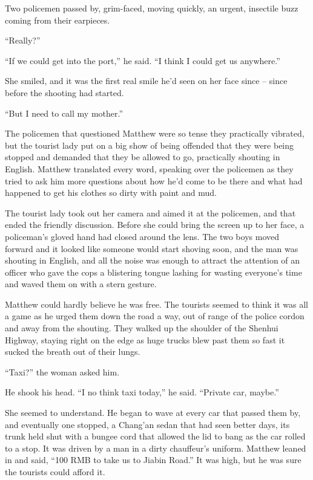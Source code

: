 Two policemen passed by, grim-faced, moving quickly, an urgent,
insectile buzz coming from their earpieces.

``Really?''

``If we could get into the port,'' he said. ``I think I could get us
anywhere.''

She smiled, and it was the first real smile he'd seen on her face
since -- since before the shooting had started.

``But I need to call my mother.''

\tb

The policemen that questioned Matthew were so tense they
practically vibrated, but the tourist lady put on a big show of
being offended that they were being stopped and demanded that they
be allowed to go, practically shouting in English. Matthew
translated every word, speaking over the policemen as they tried to
ask him more questions about how he'd come to be there and what had
happened to get his clothes so dirty with paint and mud.

The tourist lady took out her camera and aimed it at the policemen,
and that ended the friendly discussion. Before she could bring the
screen up to her face, a policeman's gloved hand had closed around
the lens. The two boys moved forward and it looked like someone
would start shoving soon, and the man was shouting in English, and
all the noise was enough to attract the attention of an officer who
gave the cops a blistering tongue lashing for wasting everyone's
time and waved them on with a stern gesture.

Matthew could hardly believe he was free. The tourists seemed to
think it was all a game as he urged them down the road a way, out
of range of the police cordon and away from the shouting. They
walked up the shoulder of the Shenhui Highway, staying right on the
edge as huge trucks blew past them so fast it sucked the breath out
of their lungs.

``Taxi?'' the woman asked him.

He shook his head. ``I no think taxi today,'' he said. ``Private car,
maybe.''

She seemed to understand. He began to wave at every car that passed
them by, and eventually one stopped, a Chang'an sedan that had seen
better days, its trunk held shut with a bungee cord that allowed
the lid to bang as the car rolled to a stop. It was driven by a man
in a dirty chauffeur's uniform. Matthew leaned in and said, ``100
RMB to take us to Jiabin Road.'' It was high, but he was sure the
tourists could afford it.

